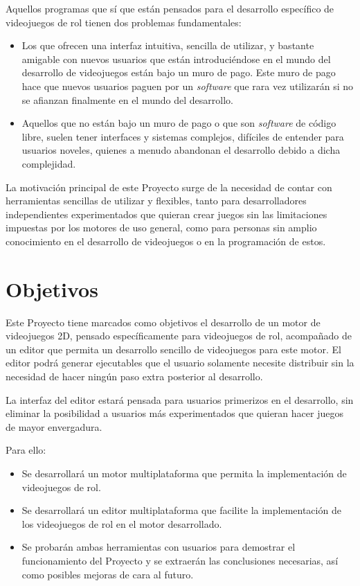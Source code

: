 \smallskip

Aquellos programas que sí que están pensados para el desarrollo específico de videojuegos de rol tienen dos problemas fundamentales:
\begin{itemize}
	\item Los que ofrecen una interfaz intuitiva, sencilla de utilizar, y bastante amigable con nuevos usuarios que están introduciéndose en el mundo del desarrollo de videojuegos están bajo un muro de pago. Este muro de pago hace que nuevos usuarios paguen por un \textit{software} que rara vez utilizarán si no se afianzan finalmente en el mundo del desarrollo.
	\item Aquellos que no están bajo un muro de pago o que son \textit{software} de código libre, suelen tener interfaces y sistemas complejos, difíciles de entender para usuarios noveles, quienes a menudo abandonan el desarrollo debido a dicha complejidad.
\end{itemize}

\medskip

La motivación principal de este Proyecto surge de la necesidad de contar con herramientas sencillas de utilizar y flexibles, tanto para desarrolladores independientes experimentados que quieran crear juegos sin las limitaciones impuestas por los motores de uso general, como para personas sin amplio conocimiento en el desarrollo de videojuegos o en la programación de estos.

\section{Objetivos}
Este Proyecto tiene marcados como objetivos el desarrollo de un motor de videojuegos 2D, pensado específicamente para videojuegos de rol, acompañado de un editor que permita un desarrollo sencillo de videojuegos para este motor. El editor podrá generar ejecutables que el usuario solamente necesite distribuir sin la necesidad de hacer ningún paso extra posterior al desarrollo.

\smallskip

La interfaz del editor estará pensada para usuarios primerizos en el desarrollo, sin eliminar la posibilidad a usuarios más experimentados que quieran hacer juegos de mayor envergadura.

\medskip

Para ello:
\begin{itemize}
	\item Se desarrollará un motor multiplataforma que permita la implementación de videojuegos de rol.
	\item Se desarrollará un editor multiplataforma que facilite la implementación de los videojuegos de rol en el motor desarrollado.
	\item Se probarán ambas herramientas con usuarios para demostrar el funcionamiento del Proyecto y se extraerán las conclusiones necesarias, así como posibles mejoras de cara al futuro.
\end{itemize}

